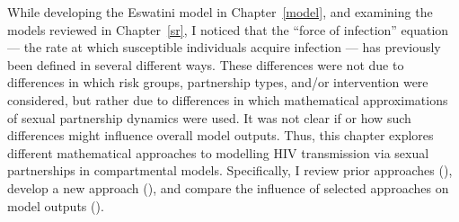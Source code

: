 While developing the Eswatini model in Chapter~\ref{model},
and examining the models reviewed in Chapter~\ref{sr},
I noticed that the ``force of infection'' equation
--- the rate at which susceptible individuals acquire infection ---
has previously been defined in several different ways.
These differences were not due to differences in
which risk groups, partnership types, and/or intervention were considered,
but rather due to differences in
which mathematical approximations of sexual partnership dynamics were used.
It was not clear if or how such differences might influence overall model outputs.
Thus, this chapter explores different mathematical approaches to
modelling HIV transmission via sexual partnerships in compartmental models.
Specifically, I review prior approaches (),
develop a new approach (),
and compare the influence of selected approaches on model outputs ().
